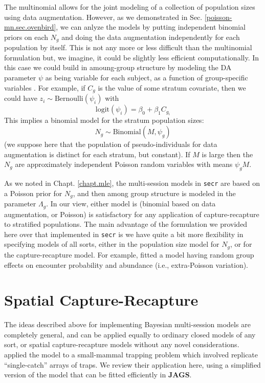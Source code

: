 The multinomial allows for the joint modeling of a collection of
population sizes using data augmentation.  However, as we 
demonstrated in Sec. \ref{poisson-mn.sec.ovenbird}, we can anlyze the models by putting
independent binomial priors on each $N_{g}$ and doing the data
augmentation independently for each population by itself. 
This is not any more or less difficult than the multinomial
formulation but, we imagine, it could be slightly less efficient
computationally. 
In this case we could build in amoung-group structure by modeling 
the DA parameter $\psi$ as being
variable for each subject,  as a function of group-specific variables
\citep[see][for an example]{hendriks_etal:2013}.
For example, if $C_{g}$ is the value of some stratum
covariate, then we could have $z_{i} \sim \mbox{Bernoulli}( \psi_{i})$
with
\[
 \mbox{logit}(\psi_{i}) = \beta_0 + \beta_1  C_{g_{i}}
\]
This implies a binomial model for the stratum population sizes:
\[
N_{g} \sim \mbox{Binomial}(M, \psi_{g})
\]  
(we suppose here that the population of pseudo-individuals for data
augmentation is distinct for each stratum, but constant).
If $M$ is large then the $N_{g}$ are approximately
independent Poisson random variables with means $\psi_{g} M$.

As we noted in Chapt. \ref{chapt.mle}, 
the multi-session models in \mbox{\tt secr}  are based on a
Poisson prior for $N_{g}$, and then among group structure is modeled in
the parameter $\Lambda_{g}$. In our view, either model is (binomial
based on data augmentation, or Poisson) is satisfactory for any
application of capture-recapture to stratified populations.  
The main advantage of the formulation we provided here over that
implemented in \mbox{\tt secr} is we have quite a bit more flexibility
in specifying models of all sorts, either in the population size model
for $N_{g}$, or for the capture-recapture model. For example,
\citet{royle_converse:2013} fitted a model having random group effects
on encounter probability and abundance (i.e., extra-Poisson
variation). 

\section{Spatial Capture-Recapture}


The ideas described above for implementing Bayesian multi-session
models are completely general, and can be applied equally to ordinary
closed models of any sort, or spatial capture-recapture models without
any novel considerations.  \citet{royle_converse:2013} applied the
model to a small-mammal trapping problem which involved replicate
``single-catch'' arrays of traps. We review their application here,
using a simplified version of the model that can be fitted efficiently
in {\bf JAGS}.

